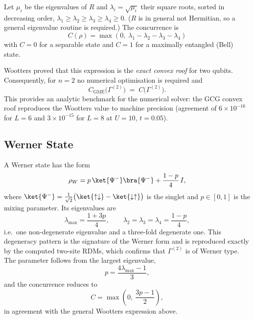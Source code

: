 Let $\mu_i$ be the eigenvalues of $R$ and $\lambda_i=\sqrt{\mu_i}$ their
square roots, sorted in decreasing order,
$\lambda_1\ge\lambda_2\ge\lambda_3\ge\lambda_4\ge0$. ($R$ is in general not
Hermitian, so a general eigenvalue routine is required.) The concurrence is
%
\begin{equation}
    \boxed{\;C(\rho) = \max\!\left(0,\;
           \lambda_1 - \lambda_2 - \lambda_3 - \lambda_4\right)\;}
\end{equation}
%
with $C=0$ for a separable state and $C=1$ for a maximally entangled (Bell)
state.

Wootters proved that this expression is the \emph{exact convex roof} for two
qubits. Consequently, for $n=2$ no numerical optimisation is required and
%
\begin{equation}
    C_{\mathrm{GME}}\big(\Gamma^{(2)}\big) \;=\; C\big(\Gamma^{(2)}\big).
\end{equation}
%
This provides an analytic benchmark for the numerical solver: the GCG convex
roof reproduces the Wootters value to machine precision (agreement of
$6\times10^{-16}$ for $L=6$ and $3\times10^{-15}$ for $L=8$ at $U=10$,
$t=0.05$).

\subsection{Werner State}
A Werner state has the form
%
\begin{equation}
    \rho_W = p\,\ket{\Psi^-}\bra{\Psi^-} + \frac{1-p}{4}\, I ,
\end{equation}
%
where $\ket{\Psi^-}=\tfrac{1}{\sqrt2}\bigl(\ket{\uparrow\downarrow}
-\ket{\downarrow\uparrow}\bigr)$ is the singlet and $p\in[0,1]$ is the mixing
parameter. Its eigenvalues are
%
\begin{equation}
    \lambda_{\max} = \frac{1+3p}{4},
    \qquad
    \lambda_2=\lambda_3=\lambda_4=\frac{1-p}{4},
\end{equation}
%
i.e.\ one non-degenerate eigenvalue and a three-fold degenerate one. This
degeneracy pattern is the signature of the Werner form and is reproduced
exactly by the computed two-site RDMs, which confirms that $\Gamma^{(2)}$ is
of Werner type. The parameter follows from the largest eigenvalue,
%
\begin{equation}
    p = \frac{4\lambda_{\max}-1}{3},
\end{equation}
%
and the concurrence reduces to
%
\begin{equation}
    C = \max\!\left(0,\ \frac{3p-1}{2}\right),
\end{equation}
%
in agreement with the general Wootters expression above.


